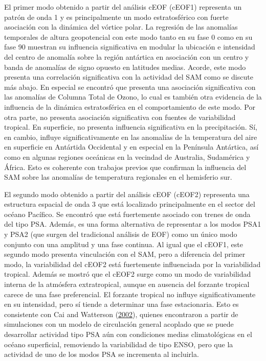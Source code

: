 \documentclass[12pt,oneside,a4paper]{reedthesis}
\begin{document}
El primer modo obtenido a partir del análisis cEOF (cEOF1) representa un patrón de onda 1 y es principalmente un modo estratosférico con fuerte asociación con la dinámica del vórtice polar.
La regresión de las anomalías temporales de altura geopotencial con este modo tanto en su fase 0 como en su fase 90 muestran su influencia significativa en modular la ubicación e intensidad del centro de anomalía sobre la región antártica en asociación con un centro y banda de anomalías de signo opuesto en latitudes medias.
Acorde, este modo presenta una correlación significativa con la actividad del SAM como se discute más abajo.
En especial se encontró que presenta una asociación significativa con las anomalías de Columna Total de Ozono, lo cual es también otra evidencia de la influencia de la dinámica estratosférica en el comportamiento de este modo.
Por otra parte, no presenta asociación significativa con fuentes de variabilidad tropical.
En superficie, no presenta influencia significativa en la precipitación.
Sí, en cambio, influye significativamente en las anomalías de la temperatura del aire en superficie en Antártida Occidental y en especial en la Península Antártica, así como en algunas regiones oceánicas en la vecindad de Australia, Sudamérica y África.
Esto es coherente con trabajos previos que confirman la influencia del SAM sobre las anomalías de temperatura regionales en el hemisferio sur.

El segundo modo obtenido a partir del análisis cEOF (cEOF2) representa una estructura espacial de onda 3 que está localizado principalmente en el sector del océano Pacífico.
Se encontró que está fuertemente asociado con trenes de onda del tipo PSA.
Además, es una forma alternativa de representar a los modos PSA1 y PSA2 (que surgen del tradicional análisis de EOF) como un único modo conjunto con una amplitud y una fase continua.
Al igual que el cEOF1, este segundo modo presenta vinculación con el SAM, pero a diferencia del primer modo, la variabilidad del cEOF2 está fuertemente influenciada por la variabilidad tropical.
Además se mostró que el cEOF2 surge como un modo de variabilidad interna de la atmósfera extratropical, aunque en ausencia del forzante tropical carece de una fase preferencial.
El forzante tropical no influye significativamente en su intensidad, pero sí tiende a determinar una fase estacionaria.
Esto es consistente con Cai and Watterson (\protect\hyperlink{ref-cai2002}{2002}), quienes encontraron a partir de simulaciones con un modelo de circulación general acoplado que se puede desarrollar actividad tipo PSA aún con condiciones medias climatológicas en el océano superficial, removiendo la variabilidad de tipo ENSO, pero que la actividad de uno de los modos PSA se incrementa al incluirla.
\end{document}
